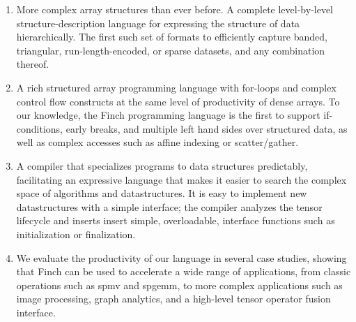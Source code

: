 \begin{enumerate}
\item 
{}

More complex array structures than ever before. A complete level-by-level
structure-description language for expressing the structure of data
hierarchically. The first such set of formats to efficiently capture banded,
triangular, run-length-encoded, or sparse datasets, and any combination thereof.
\item A rich structured array programming language with for-loops
and complex control flow constructs at the same level of productivity
of dense arrays. To our knowledge, the Finch programming language is the first
to support if-conditions, early breaks, and multiple left hand sides over
structured data, as well as complex accesses such as affine indexing or scatter/gather. 
\item A compiler that specializes programs to data structures 
predictably, facilitating an expressive language that makes it easier to search the complex
space of algorithms and datastructures. It is easy to implement new datastructures with a simple interface; the compiler analyzes the tensor lifecycle and inserts insert simple, overloadable, interface functions such as
initialization or finalization.
\item We evaluate the productivity of our language in several case studies,
showing that Finch can be used to accelerate a wide range of applications, 
from classic operations such as spmv and spgemm, to more complex applications such as image processing, graph analytics, and a high-level tensor operator fusion interface.

\end{enumerate}
